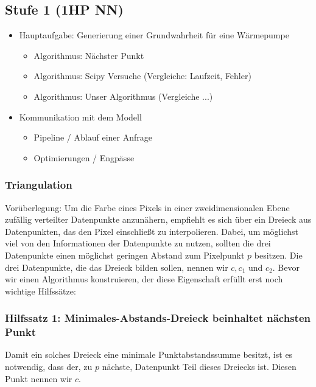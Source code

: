 \documentclass[a4paper]{extarticle}
\begin{document}
    \subsection{Stufe 1 (1HP NN)}
    \begin{itemize}
        \item Hauptaufgabe: Generierung einer Grundwahrheit für eine Wärmepumpe
        \begin{itemize}
            \item Algorithmus: Nächster Punkt
            \item Algorithmus: Scipy Versuche (Vergleiche: Laufzeit, Fehler)
            \item Algorithmus: Unser Algorithmus (Vergleiche ...)
        \end{itemize}
        \item Kommunikation mit dem Modell
        \begin{itemize}
            \item Pipeline / Ablauf einer Anfrage
            \item Optimierungen / Engpässe
        \end{itemize}
    \end{itemize}
    \subsubsection{Triangulation}
    Vorüberlegung: Um die Farbe eines Pixels in einer zweidimensionalen Ebene zufällig verteilter
    Datenpunkte anzunähern, empfiehlt es sich über ein Dreieck aus Datenpunkten, das den Pixel 
    einschließt zu interpolieren. Dabei, um möglichst viel von den Informationen der Datenpunkte 
    zu nutzen, sollten die drei Datenpunkte einen möglichst geringen Abstand zum Pixelpunkt $p$ 
    besitzen. Die drei Datenpunkte, die das Dreieck bilden sollen, nennen wir $c, c_1$ und $c_2$.
    Bevor wir einen Algorithmus konstruieren, der diese Eigenschaft erfüllt erst noch wichtige
    Hilfssätze:

    \subsubsection{Hilfssatz 1: Minimales-Abstands-Dreieck beinhaltet nächsten Punkt}
    Damit ein solches Dreieck eine minimale Punktabstandssumme besitzt,
    ist es notwendig, dass der, zu $p$ nächste, Datenpunkt Teil dieses Dreiecks ist. Diesen Punkt 
    nennen wir $c$.
\end{document}
